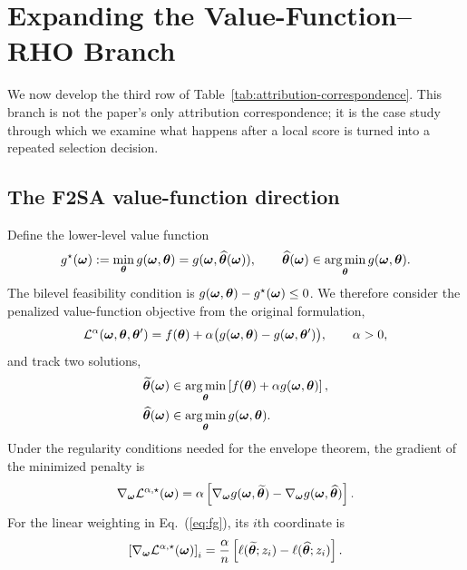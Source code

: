 \section{Expanding the Value-Function--RHO Branch}
\label{sec:connection}

We now develop the third row of
Table~\ref{tab:attribution-correspondence}. This branch is not the paper's only
attribution correspondence; it is the case study through which we examine what
happens after a local score is turned into a repeated selection decision.

\subsection{The F2SA value-function direction}

Define the lower-level value function
\begin{equation}
g^\star({\bm{\omega}}):=\min_{{\bm{\theta}}}g({\bm{\omega}},{\bm{\theta}})
=g({\bm{\omega}},\widehat{{\bm{\theta}}}({\bm{\omega}})),
\qquad
\widehat{{\bm{\theta}}}({\bm{\omega}})\in\operatorname*{arg\,min}_{{\bm{\theta}}}g({\bm{\omega}},{\bm{\theta}}).
\end{equation}
The bilevel feasibility condition is
$g({\bm{\omega}},{\bm{\theta}})-g^\star({\bm{\omega}})\leq 0$. We therefore consider the
penalized value-function objective from the original formulation,
\begin{equation}
\mathcal{L}^{\alpha}({\bm{\omega}},{\bm{\theta}},{\bm{\theta}}')
=f({\bm{\theta}})+\alpha\bigl(g({\bm{\omega}},{\bm{\theta}})
-g({\bm{\omega}},{\bm{\theta}}')\bigr),
\qquad \alpha>0,
\label{eq:f2sa-penalty}
\end{equation}
and track two solutions,
\begin{align}
\widetilde{{\bm{\theta}}}({\bm{\omega}})
&\in\operatorname*{arg\,min}_{{\bm{\theta}}}
    \left[f({\bm{\theta}})+\alpha g({\bm{\omega}},{\bm{\theta}})\right],
\label{eq:tilde-solution}\\
\widehat{{\bm{\theta}}}({\bm{\omega}})
&\in\operatorname*{arg\,min}_{{\bm{\theta}}}g({\bm{\omega}},{\bm{\theta}}).
\label{eq:hat-solution}
\end{align}
Under the regularity conditions needed for the envelope theorem, the gradient
of the minimized penalty is
\begin{equation}
\nabla_{{\bm{\omega}}}\mathcal{L}^{\alpha,\star}({\bm{\omega}})
=\alpha\left[
\nabla_{{\bm{\omega}}}g({\bm{\omega}},\widetilde{{\bm{\theta}}})
-\nabla_{{\bm{\omega}}}g({\bm{\omega}},\widehat{{\bm{\theta}}})
\right].
\label{eq:f2sa-gradient}
\end{equation}
For the linear weighting in Eq.~(\ref{eq:fg}), its $i$th coordinate is
\begin{equation}
\left[\nabla_{{\bm{\omega}}}\mathcal{L}^{\alpha,\star}({\bm{\omega}})\right]_i
=\frac{\alpha}{n}\left[
\ell(\widetilde{{\bm{\theta}}};z_i)-
\ell(\widehat{{\bm{\theta}}};z_i)
\right].
\label{eq:loss-difference-gradient}
\end{equation}
